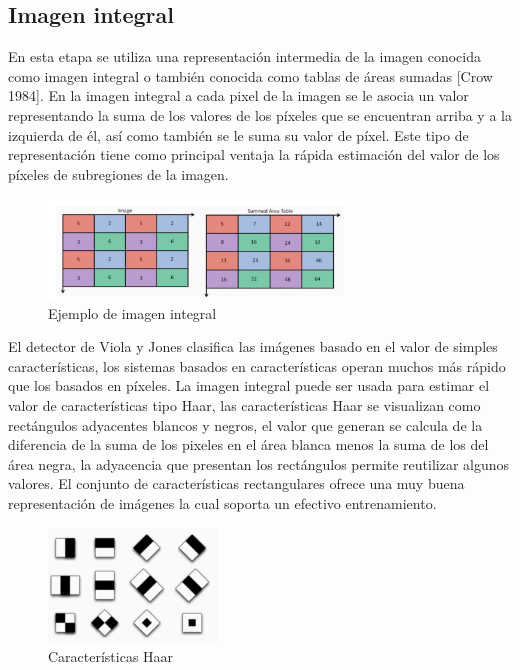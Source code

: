    \subsection{Imagen integral}
   En esta etapa se utiliza una representación intermedia de la imagen conocida como imagen integral o también conocida como tablas de áreas sumadas [Crow 1984]. En la imagen integral a cada pixel de la imagen se le asocia un valor representando la suma de los valores de los píxeles que se encuentran arriba y a la izquierda de él, así como también se le suma su valor de píxel. Este tipo de representación tiene como principal ventaja la rápida estimación del valor de los píxeles de subregiones de la imagen.
   \begin{figure}[htbp]
   	\centering
   	\includegraphics[width=0.7\textwidth]{./pictures/imagenIntegral}
   	\caption{Ejemplo de imagen integral}\label{fig: figura}
   \end{figure}
   El detector de Viola y Jones clasifica las imágenes basado en el valor de simples características, los sistemas basados en características operan muchos más rápido que los basados en píxeles. La imagen integral puede ser usada para estimar el valor de características tipo Haar, las características Haar se visualizan como rectángulos adyacentes blancos y negros, el valor que generan se calcula de la diferencia de la suma de los pixeles en el área blanca menos la suma de los del área negra, la adyacencia que presentan los rectángulos permite reutilizar algunos valores. El conjunto de características rectangulares ofrece una muy buena representación de imágenes la cual soporta un efectivo entrenamiento.
   
   \begin{figure}[htbp]
   	\centering
   	\includegraphics[width=0.4\textwidth]{./pictures/haar}
   	\caption{Características Haar}\label{fig: figura}
   \end{figure}
   

